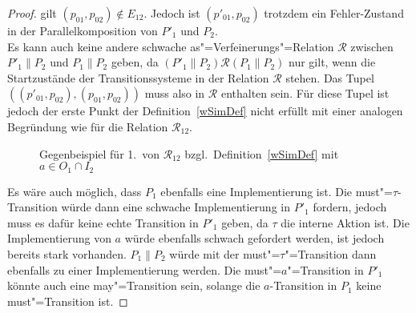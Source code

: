 \begin{proof}
  gilt $(p_{01},p_{02})\notin E_{12}$. Jedoch ist $(p'_{01},p_{02})$ trotzdem
  ein Fehler-Zustand in der Parallelkomposition von $P'_1$ und $P_2$.\\
  Es kann auch keine andere schwache as"=Verfeinerungs"=Relation $\mathcal{R}$
  zwischen $P'_1\|P_2$ und $P_1\|P_2$ geben, da $(P'_1\|P_2) \mathcal{R}
  (P_1\|P_2)$ nur gilt, wenn die Startzustände der Transitionssysteme in der
  Relation $\mathcal{R}$ stehen. Das Tupel $((p'_{01},p_{02}),(p_{01},p_{02}))$
  muss also in $\mathcal{R}$ enthalten sein. Für diese Tupel ist jedoch der
  erste Punkt der Definition~\ref{wSimDef} nicht erfüllt mit einer analogen
  Begründung wie für die Relation $\mathcal{R}_{12}$.

  \begin{figure}[h!tbp]
    \begin{center}
      \caption{Gegenbeispiel für 1.\ von $\mathcal{R}_{12}$ bzgl.\
      Definition~\ref{wSimDef} mit $a\in O_1\cap I_2$}
      \label{bsp1wSim}
    \end{center}
  \end{figure}

  Es wäre auch möglich, dass $P_1$ ebenfalls eine Implementierung ist. Die
  must"=$\tau$-Transition würde dann eine schwache Implementierung in $P'_1$
  fordern, jedoch muss es dafür keine echte Transition in $P'_1$ geben, da
  $\tau$ die interne Aktion ist. Die Implementierung von $a$ würde ebenfalls
  schwach gefordert werden, ist jedoch bereits stark vorhanden. $P_1\|P_2$
  würde mit der must"=$\tau$"=Transition dann ebenfalls zu einer
  Implementierung werden. Die must"=$a$"=Transition in $P'_1$ könnte auch eine
  may"=Transition sein, solange die $a$-Transition in $P_1$ keine
  must"=Transition ist.
\end{proof}


